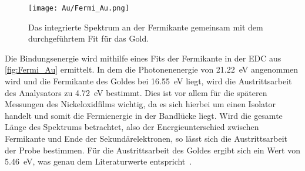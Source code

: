         \begin{figure}
            \centering
            \texttt{[image: Au/Fermi\_Au.png]}
            \caption{Das integrierte Spektrum an der Fermikante gemeinsam mit dem durchgeführtem Fit für das Gold.}
            \label{fig:Fermi_Au}
        \end{figure}
        Die Bindungsenergie wird mithilfe eines Fits der Fermikante in der EDC aus \autoref{fig:Fermi_Au} ermittelt.
        In dem die Photonenenergie von \SI{21.22}{\electronvolt} angenommen wird und die Fermikante des Goldes bei \SI{16.55}{\electronvolt} liegt, wird die Austrittsarbeit des Analysators zu \SI{4.72}{\electronvolt} bestimmt.
        Dies ist vor allem für die späteren Messungen des Nickeloxidfilms wichtig, da es sich hierbei um einen Isolator handelt und somit die Fermienergie in der Bandlücke liegt.
        Wird die gesamte Länge des Spektrums betrachtet, also der Energieunterschied zwischen Fermikante und Ende der Sekundärelektronen, so lässt sich die Austrittsarbeit der Probe bestimmen.
        Für die Austrittsarbeit des Goldes ergibt sich ein Wert von \SI{5.46}{\electronvolt}, was genau dem Literaturwerte entspricht~\cite{5A_4}.
   
